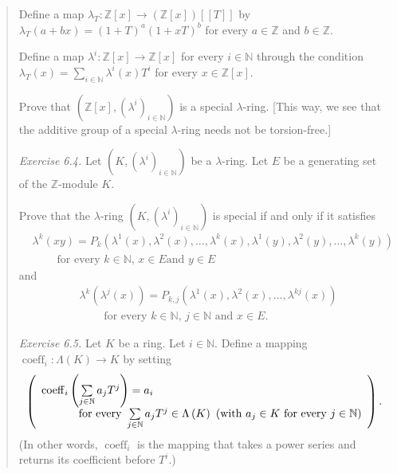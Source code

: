 \documentclass[numbers=enddot,12pt,final,onecolumn,notitlepage]{scrartcl}%
\begin{document}
\begin{quotation}
Define a map $\lambda_{T}:\mathbb{Z}\left[  x\right]  \rightarrow\left(
\mathbb{Z}\left[  x\right]  \right)  \left[  \left[  T\right]  \right]  $ by
$\lambda_{T}\left(  a+bx\right)  =\left(  1+T\right)  ^{a}\left(  1+xT\right)
^{b}$ for every $a\in\mathbb{Z}$ and $b\in\mathbb{Z}$.

Define a map $\lambda^{i}:\mathbb{Z}\left[  x\right]  \rightarrow
\mathbb{Z}\left[  x\right]  $ for every $i\in\mathbb{N}$ through the condition
$\lambda_{T}\left(  x\right)  =\sum\limits_{i\in\mathbb{N}}\lambda^{i}\left(
x\right)  T^{i}$ for every $x\in\mathbb{Z}\left[  x\right]  $.

Prove that $\left(  \mathbb{Z}\left[  x\right]  ,\left(  \lambda^{i}\right)
_{i\in\mathbb{N}}\right)  $ is a special $\lambda$-ring. [This way, we see
that the additive group of a special $\lambda$-ring needs not be torsion-free.]

\textit{Exercise 6.4.} Let $\left(  K,\left(  \lambda^{i}\right)
_{i\in\mathbb{N}}\right)  $ be a $\lambda$-ring. Let $E$ be a generating set
of the $\mathbb{Z}$-module $K$.

Prove that the $\lambda$-ring $\left(  K,\left(  \lambda^{i}\right)
_{i\in\mathbb{N}}\right)  $ is special if and only if it satisfies%
\begin{align}
&  \lambda^{k}\left(  xy\right)  =P_{k}\left(  \lambda^{1}\left(  x\right)
,\lambda^{2}\left(  x\right)  ,...,\lambda^{k}\left(  x\right)  ,\lambda
^{1}\left(  y\right)  ,\lambda^{2}\left(  y\right)  ,...,\lambda^{k}\left(
y\right)  \right) \nonumber\\
&  \ \ \ \ \ \ \ \ \ \ \text{for every }k\in\mathbb{N}\text{, }x\in E\text{
and }y\in E \label{LkxyE}%
\end{align}
and%
\begin{align}
&  \lambda^{k}\left(  \lambda^{j}\left(  x\right)  \right)  =P_{k,j}\left(
\lambda^{1}\left(  x\right)  ,\lambda^{2}\left(  x\right)  ,...,\lambda
^{kj}\left(  x\right)  \right) \nonumber\\
&  \ \ \ \ \ \ \ \ \ \ \text{for every }k\in\mathbb{N}\text{, }j\in
\mathbb{N}\text{ and }x\in E. \label{LkLjxE}%
\end{align}


\textit{Exercise 6.5.} Let $K$ be a ring. Let $i\in\mathbb{N}$. Define a
mapping $\operatorname*{coeff}\nolimits_{i}:\Lambda\left(  K\right)
\rightarrow K$ by setting
\[
\left(
\begin{array}
[c]{l}%
\operatorname*{coeff}\nolimits_{i}\left(  \sum\limits_{j\in\mathbb{N}}%
a_{j}T^{j}\right)  =a_{i}\\
\ \ \ \ \ \ \ \ \ \ \text{for every }\sum\limits_{j\in\mathbb{N}}a_{j}T^{j}%
\in\Lambda\left(  K\right)  \text{ (with }a_{j}\in K\text{ for every }%
j\in\mathbb{N}\text{)}%
\end{array}
\right)  .
\]
(In other words, $\operatorname*{coeff}\nolimits_{i}$ is the mapping that
takes a power series and returns its coefficient before $T^{i}$.)


\end{quotation}
\end{document}
